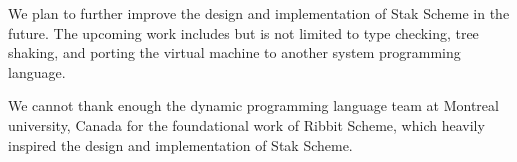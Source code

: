 \documentclass[sigplan, anonymous, review]{acmart}
\begin{document}
We plan to further improve the design and implementation of Stak
Scheme in the future. The upcoming work includes but is not limited
to type checking, tree shaking, and porting the virtual machine to
another system programming language.

\begin{acks}
  We cannot thank enough the dynamic programming language team at
  Montreal university, Canada for the foundational work of Ribbit
  Scheme, which heavily inspired the design and implementation of
  Stak Scheme.
\end{acks}



\end{document}
